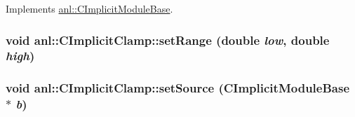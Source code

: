 Implements \hyperlink{classanl_1_1CImplicitModuleBase_ab88f8a1822dcfbc13ba5230318b0acd1}{anl::CImplicitModuleBase}.\hypertarget{classanl_1_1CImplicitClamp_ae009300b76acdea751bdf1f509824c58}{
\subsubsection[{setRange}]{\setlength{\rightskip}{0pt plus 5cm}void anl::CImplicitClamp::setRange (double {\em low}, \/  double {\em high})}}
\label{classanl_1_1CImplicitClamp_ae009300b76acdea751bdf1f509824c58}
\hypertarget{classanl_1_1CImplicitClamp_a9b2d8baf28a8d66910178a0f9db54ee5}{
\subsubsection[{setSource}]{\setlength{\rightskip}{0pt plus 5cm}void anl::CImplicitClamp::setSource ({\bf CImplicitModuleBase} $\ast$ {\em b})}}
\label{classanl_1_1CImplicitClamp_a9b2d8baf28a8d66910178a0f9db54ee5}


